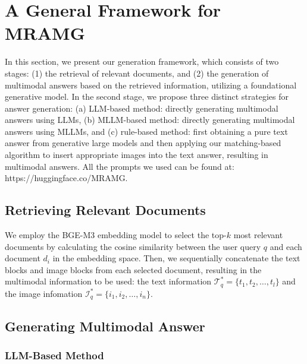 \section{A General Framework for MRAMG}
\label{sec:framework}

In this section, we present our generation framework, which consists of two stages: (1) the retrieval of relevant documents, and (2) the generation of multimodal answers based on the retrieved information, utilizing a foundational generative model. In the second stage, we propose three distinct strategies for answer generation: (a) LLM-based method: directly generating multimodal answers using LLMs, (b) MLLM-based method: directly generating multimodal answers using MLLMs, and (c) rule-based method: first obtaining a pure text answer from generative large models and then applying our matching-based algorithm to insert appropriate images into the text answer, resulting in multimodal answers. All the prompts we used can be found at: https://huggingface.co/MRAMG.

\subsection{Retrieving Relevant Documents}
We employ the BGE-M3 embedding model \citep{chen2024bge} to select the top-$k$ most relevant documents by calculating the cosine similarity between the user query $q$ and each document $d_i$ in the embedding space.
Then, we sequentially concatenate the text blocks and image blocks from each selected document, resulting in the multimodal information to be used: the text information $\mathcal{T}_q^* = \{t_1, t_2, \dots, t_l\}$ and the image infomation $\mathcal{I}_q^* = \{i_1, i_2, \dots, i_n\}$.

\subsection{Generating Multimodal Answer}



\subsubsection{LLM-Based Method}

